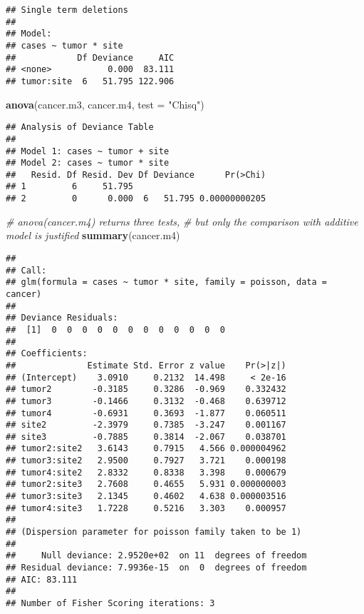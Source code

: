 \documentclass[]{book}
\newenvironment{Shaded}{\begin{snugshade}}{\end{snugshade}}
\newcommand{\CommentTok}[1]{\textcolor[rgb]{0.56,0.35,0.01}{\textit{#1}}}
\newcommand{\DataTypeTok}[1]{\textcolor[rgb]{0.13,0.29,0.53}{#1}}
\newcommand{\KeywordTok}[1]{\textcolor[rgb]{0.13,0.29,0.53}{\textbf{#1}}}
\newcommand{\NormalTok}[1]{#1}
\newcommand{\StringTok}[1]{\textcolor[rgb]{0.31,0.60,0.02}{#1}}
\theoremstyle{definition}
\theoremstyle{definition}
\theoremstyle{definition}
\theoremstyle{remark}
\begin{document}
\begin{verbatim}
## Single term deletions
## 
## Model:
## cases ~ tumor * site
##            Df Deviance     AIC
## <none>           0.000  83.111
## tumor:site  6   51.795 122.906
\end{verbatim}

\begin{Shaded}
\begin{Highlighting}[]
\KeywordTok{anova}\NormalTok{(cancer.m3, cancer.m4, }\DataTypeTok{test =} \StringTok{"Chisq"}\NormalTok{)}
\end{Highlighting}
\end{Shaded}

\begin{verbatim}
## Analysis of Deviance Table
## 
## Model 1: cases ~ tumor + site
## Model 2: cases ~ tumor * site
##   Resid. Df Resid. Dev Df Deviance      Pr(>Chi)
## 1         6     51.795                          
## 2         0      0.000  6   51.795 0.00000000205
\end{verbatim}

\begin{Shaded}
\begin{Highlighting}[]
\CommentTok{# anova(cancer.m4) returns three tests, }
\CommentTok{# but only the comparison with additive model is justified}
\KeywordTok{summary}\NormalTok{(cancer.m4)}
\end{Highlighting}
\end{Shaded}

\begin{verbatim}
## 
## Call:
## glm(formula = cases ~ tumor * site, family = poisson, data = cancer)
## 
## Deviance Residuals: 
##  [1]  0  0  0  0  0  0  0  0  0  0  0  0
## 
## Coefficients:
##              Estimate Std. Error z value    Pr(>|z|)
## (Intercept)    3.0910     0.2132  14.498     < 2e-16
## tumor2        -0.3185     0.3286  -0.969    0.332432
## tumor3        -0.1466     0.3132  -0.468    0.639712
## tumor4        -0.6931     0.3693  -1.877    0.060511
## site2         -2.3979     0.7385  -3.247    0.001167
## site3         -0.7885     0.3814  -2.067    0.038701
## tumor2:site2   3.6143     0.7915   4.566 0.000004962
## tumor3:site2   2.9500     0.7927   3.721    0.000198
## tumor4:site2   2.8332     0.8338   3.398    0.000679
## tumor2:site3   2.7608     0.4655   5.931 0.000000003
## tumor3:site3   2.1345     0.4602   4.638 0.000003516
## tumor4:site3   1.7228     0.5216   3.303    0.000957
## 
## (Dispersion parameter for poisson family taken to be 1)
## 
##     Null deviance: 2.9520e+02  on 11  degrees of freedom
## Residual deviance: 7.9936e-15  on  0  degrees of freedom
## AIC: 83.111
## 
## Number of Fisher Scoring iterations: 3
\end{verbatim}
\end{document}
